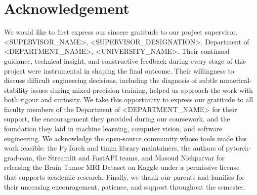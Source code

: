 \documentclass[12pt,a4paper,oneside]{report}
\begin{document}
\chapter*{Acknowledgement}
We would like to first express our sincere gratitude to our project supervisor, <SUPERVISOR\_NAME>, <SUPERVISOR\_DESIGNATION>, Department of <DEPARTMENT\_NAME>, <UNIVERSITY\_NAME>. Their continued guidance, technical insight, and constructive feedback during every stage of this project were instrumental in shaping the final outcome. Their willingness to discuss difficult engineering decisions, including the diagnosis of subtle numerical-stability issues during mixed-precision training, helped us approach the work with both rigour and curiosity.
We take this opportunity to express our gratitude to all faculty members of the Department of <DEPARTMENT\_NAME> for their support, the encouragement they provided during our coursework, and the foundation they laid in machine learning, computer vision, and software engineering.
We acknowledge the open-source community whose tools made this work feasible: the PyTorch and timm library maintainers, the authors of pytorch-grad-cam, the Streamlit and FastAPI teams, and Masoud Nickparvar for releasing the Brain Tumor MRI Dataset on Kaggle under a permissive license that supports academic research.
Finally, we thank our parents and families for their unceasing encouragement, patience, and support throughout the semester.
\end{document}
